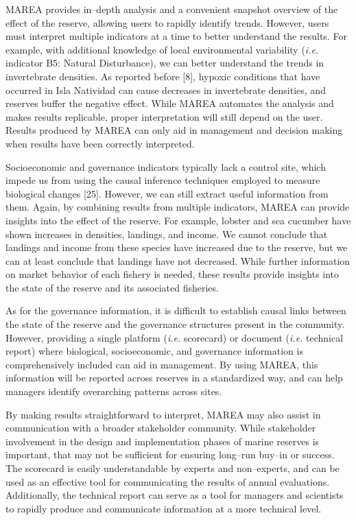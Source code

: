 \documentclass[12pt,]{article}
\begin{document}
MAREA provides in--depth analysis and a convenient snapshot overview of
the effect of the reserve, allowing users to rapidly identify trends.
However, users must interpret multiple indicators at a time to better
understand the results. For example, with additional knowledge of local
environmental variability (\emph{i.e.} indicator B5: Natural
Disturbance), we can better understand the trends in invertebrate
densities. As reported before {[}8{]}, hypoxic conditions that have
occurred in Isla Natividad can cause decreases in invertebrate
densities, and reserves buffer the negative effect. While MAREA
automates the analysis and makes results replicable, proper
interpretation will still depend on the user. Results produced by MAREA
can only aid in management and decision making when results have been
correctly interpreted.

Socioeconomic and governance indicators typically lack a control site,
which impede us from using the causal inference techniques employed to
measure biological changes {[}25{]}. However, we can still extract
useful information from them. Again, by combining results from multiple
indicators, MAREA can provide insights into the effect of the reserve.
For example, lobster and sea cucumber have shown increases in densities,
landings, and income. We cannot conclude that landings and income from
these species have increased due to the reserve, but we can at least
conclude that landings have not decreased. While further information on
market behavior of each fishery is needed, these results provide
insights into the state of the reserve and its associated fisheries.

As for the governance information, it is difficult to establish causal
links between the state of the reserve and the governance structures
present in the community. However, providing a single platform
(\emph{i.e.} scorecard) or document (\emph{i.e.} technical report) where
biological, socioeconomic, and governance information is comprehensively
included can aid in management. By using MAREA, this information will be
reported across reserves in a standardized way, and can help managers
identify overarching patterns across sites.

By making results straightforward to interpret, MAREA may also assist in
communication with a broader stakeholder community. While stakeholder
involvement in the design and implementation phases of marine reserves
is important, that may not be sufficient for ensuring long--run buy--in
or success. The scorecard is easily understandable by experts and
non--experts, and can be used as an effective tool for communicating the
results of annual evaluations. Additionally, the technical report can
serve as a tool for managers and scientists to rapidly produce and
communicate information at a more technical level.
\end{document}
